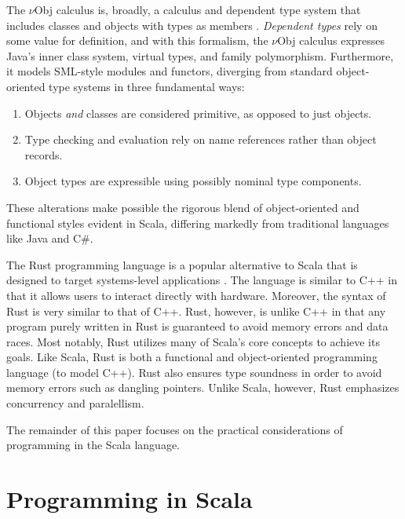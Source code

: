\documentclass[jou,apacite]{IEEEtran}
\begin{document}
The $\nu$Obj calculus is, broadly, a calculus and dependent type system that
includes classes and objects with types as members
\cite{odersky_nominal_2003}. \emph{Dependent types} rely on some value for
definition, and with this formalism, the $\nu$Obj calculus expresses Java's
inner class system, virtual types, and family polymorphism. Furthermore, it
models SML-style modules and functors, diverging from standard object-oriented
type systems in three fundamental ways:
\begin{enumerate}
\item Objects \emph{and} classes are considered primitive, as opposed to just
  objects.
\item Type checking and evaluation rely on name references rather than object
  records.
\item Object types are expressible using possibly nominal type components.
\end{enumerate}
These alterations make possible the rigorous blend of object-oriented and
functional styles evident in Scala, differing markedly from traditional
languages like Java and C\#.

The Rust programming language is a popular alternative to Scala that is designed
to target systems-level applications \cite{matsakis_rust_2014}. The language is
similar to C++ in that it allows users to interact directly with
hardware. Moreover, the syntax of Rust is very similar to that of C++.  Rust,
however, is unlike C++ in that any program purely written in Rust is guaranteed
to avoid memory errors and data races.  Most notably, Rust utilizes many of
Scala's core concepts to achieve its goals.  Like Scala, Rust is both a
functional and object-oriented programming language (to model C++). Rust also
ensures type soundness in order to avoid memory errors such as dangling
pointers. Unlike Scala, however, Rust emphasizes concurrency and paralellism.

The remainder of this paper focuses on the practical considerations of
programming in the Scala language.

\section{Programming in Scala}
\label{sec:programming-scala}
\end{document}
